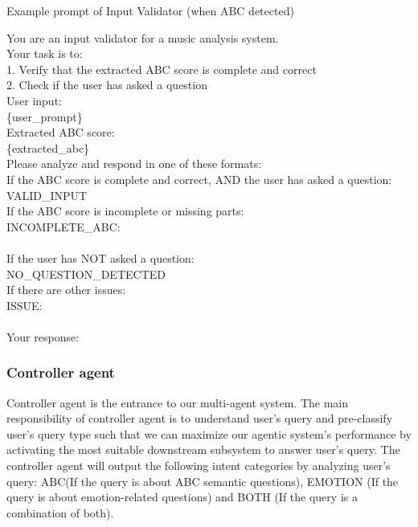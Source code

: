 \documentclass[sigconf]{acmart}
\begin{document}
\begin{promptbox}{Example prompt of Input Validator (when ABC detected)}

You are an input validator for a music analysis system.\\

Your task is to:\\
1. Verify that the extracted ABC score is complete and correct\\
2. Check if the user has asked a question\\

User input:\\
\{user\_prompt\}\\

Extracted ABC score:\\
\{extracted\_abc\}\\

Please analyze and respond in one of these formats:\\

If the ABC score is complete and correct, AND the user has asked a question:\\
VALID\_INPUT\\

If the ABC score is incomplete or missing parts:\\
INCOMPLETE\_ABC:\\
[description of what's missing or what should be added]\\

If the user has NOT asked a question:\\
NO\_QUESTION\_DETECTED\\

If there are other issues:\\
ISSUE:\\
[description of the issue]\\

Your response:
\end{promptbox}
\subsubsection{Controller agent}
Controller agent is the entrance to our multi-agent system. The main responsibility of controller agent is to understand user’s query and pre-classify user’s  query type such that we can maximize our agentic system’s performance by activating the most suitable downstream subsystem to answer user’s query. The controller agent will output the following intent categories by analyzing user’s query: ABC(If the query is about ABC semantic questions), EMOTION (If the query is about emotion-related questions) and BOTH (If the query is a combination of both). 
\end{document}
